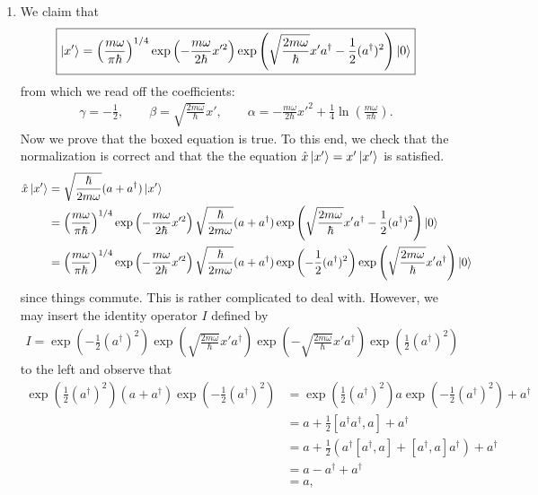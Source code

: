 \documentclass{article}
\theoremstyle{definition}
\newcommand{\al}{\alpha}
\newcommand{\be}{\beta}
\newcommand{\f}[2]{\frac{#1}{#2}}
\newcommand{\lp}{\left(}
\newcommand{\rp}{\right)}
\begin{document}
\begin{enumerate}[label=(\alph*)]
	\item We claim that 
	\begin{align*}
	\boxed{\ket{x'} = \lp \f{m\omega}{\pi \hbar} \rp^{1/4} \exp\lp -\f{m\omega}{2\hbar} x'^2\rp\exp\lp \sqrt{\f{2m\omega}{\hbar}} x' {a}^\dagger - \f{1}{2}({a}^\dagger)^2 \rp \ket{0}}
	\end{align*}
	from which we read off the coefficients:
	\begin{align*}
	\gamma = -\f{1}{2}, \quad\quad \be = \sqrt{\f{2m\omega}{\hbar}} x',\quad\quad \al = -\f{m\omega}{2\hbar} x'^2 + \f{1}{4}\ln\lp \f{m\omega}{\pi \hbar} \rp.
	\end{align*}
	Now we prove that the boxed equation is true. To this end, we check that the normalization is correct and that the the equation $\hat{x}\ket{x'} = x'\ket{x'}$ is satisfied. 
	\begin{align*}
	\hat{x}\ket{x'} &= \sqrt{\f{\hbar}{2m\omega}} ( a + {a}^\dagger) \ket{x'} \\
	&=  \lp \f{m\omega}{\pi \hbar} \rp^{1/4} \exp\lp -\f{m\omega}{2\hbar} x'^2\rp\sqrt{\f{\hbar}{2m\omega}} ( a + {a}^\dagger)
	\exp\lp \sqrt{\f{2m\omega}{\hbar}} x' {a}^\dagger - \f{1}{2}({a}^\dagger)^2 \rp \ket{0}\\
	&=  \lp \f{m\omega}{\pi \hbar} \rp^{1/4} \exp\lp -\f{m\omega}{2\hbar} x'^2\rp\sqrt{\f{\hbar}{2m\omega}} ( a + {a}^\dagger)
	 \exp\lp - \f{1}{2}({a}^\dagger)^2 \rp \exp\lp \sqrt{\f{2m\omega}{\hbar}} x' {a}^\dagger\rp\ket{0}
	\end{align*}
	since things commute. This is rather complicated to deal with. However, we may insert the identity operator $I$ defined by 
	\begin{align*}
	I = 
	\exp(-\f{1}{2}(a^\dagger)^2) 
	\exp\lp \sqrt{\f{2m\omega}{\hbar}} x' {a}^\dagger  \rp 
	\exp\lp -\sqrt{\f{2m\omega}{\hbar}} x' {a}^\dagger  \rp 
	\exp\lp \f{1}{2}(a^\dagger)^2 \rp
	\end{align*}
	to the left and observe that
	\begin{align*}
	\exp\lp \f{1}{2}(a^\dagger)^2 \rp (a+a^\dagger)\exp\lp -\f{1}{2}(a^\dagger)^2 \rp 
	&= \exp\lp \f{1}{2}(a^\dagger)^2 \rp a\exp\lp -\f{1}{2}(a^\dagger)^2 \rp + a^\dagger \\
	&= a + \f{1}{2}[a^\dagger a^\dagger,a] + a^\dagger\\
	&= a + \f{1}{2}(a^\dagger[a^\dagger,a] + [a^\dagger,a]a^\dagger) + a^\dagger\\
	&= a - a^\dagger + a^\dagger \\
	&= a,
	\end{align*}

\end{enumerate}
\end{document}
